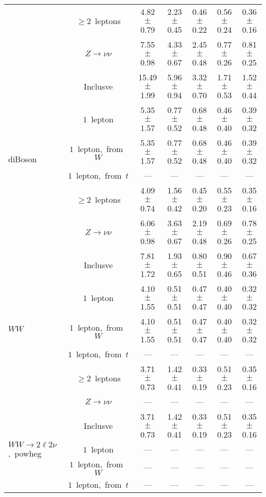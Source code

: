 \documentclass{article}
\begin{document}
\begin{longtable}{|l|c|c|c|c|c|c|}
 & $\ge2$~leptons  & 4.82 $\pm$ 0.79  & 2.23 $\pm$ 0.45  & 0.46 $\pm$ 0.22  & 0.56 $\pm$ 0.24  & 0.36 $\pm$ 0.16 \\* 
 & $Z\rightarrow\nu\nu$  & 7.55 $\pm$ 0.98  & 4.33 $\pm$ 0.67  & 2.45 $\pm$ 0.48  & 0.77 $\pm$ 0.26  & 0.81 $\pm$ 0.25 \\* 
\hline 
\multirow{6}{*}{diBoson} & Inclusve  & 15.49 $\pm$ 1.99  & 5.96 $\pm$ 0.94  & 3.32 $\pm$ 0.70  & 1.71 $\pm$ 0.53  & 1.52 $\pm$ 0.44 \\* 
 & $1$~lepton  & 5.35 $\pm$ 1.57  & 0.77 $\pm$ 0.52  & 0.68 $\pm$ 0.48  & 0.46 $\pm$ 0.40  & 0.39 $\pm$ 0.32 \\* 
 & $1$~lepton,~from~$W$  & 5.35 $\pm$ 1.57  & 0.77 $\pm$ 0.52  & 0.68 $\pm$ 0.48  & 0.46 $\pm$ 0.40  & 0.39 $\pm$ 0.32 \\* 
 & $1$~lepton,~from~$t$  & ---  & ---  & ---  & ---  & --- \\* 
 & $\ge2$~leptons  & 4.09 $\pm$ 0.74  & 1.56 $\pm$ 0.42  & 0.45 $\pm$ 0.20  & 0.55 $\pm$ 0.23  & 0.35 $\pm$ 0.16 \\* 
 & $Z\rightarrow\nu\nu$  & 6.06 $\pm$ 0.98  & 3.63 $\pm$ 0.67  & 2.19 $\pm$ 0.48  & 0.69 $\pm$ 0.26  & 0.78 $\pm$ 0.25 \\* 
\hline 
\multirow{6}{*}{$WW$} & Inclusve  & 7.81 $\pm$ 1.72  & 1.93 $\pm$ 0.65  & 0.80 $\pm$ 0.51  & 0.90 $\pm$ 0.46  & 0.67 $\pm$ 0.36 \\* 
 & $1$~lepton  & 4.10 $\pm$ 1.55  & 0.51 $\pm$ 0.51  & 0.47 $\pm$ 0.47  & 0.40 $\pm$ 0.40  & 0.32 $\pm$ 0.32 \\* 
 & $1$~lepton,~from~$W$  & 4.10 $\pm$ 1.55  & 0.51 $\pm$ 0.51  & 0.47 $\pm$ 0.47  & 0.40 $\pm$ 0.40  & 0.32 $\pm$ 0.32 \\* 
 & $1$~lepton,~from~$t$  & ---  & ---  & ---  & ---  & --- \\* 
 & $\ge2$~leptons  & 3.71 $\pm$ 0.73  & 1.42 $\pm$ 0.41  & 0.33 $\pm$ 0.19  & 0.51 $\pm$ 0.23  & 0.35 $\pm$ 0.16 \\* 
 & $Z\rightarrow\nu\nu$  & ---  & ---  & ---  & ---  & --- \\* 
\hline 
\multirow{6}{*}{$WW{\rightarrow}2\ell2\nu$,~powheg} & Inclusve  & 3.71 $\pm$ 0.73  & 1.42 $\pm$ 0.41  & 0.33 $\pm$ 0.19  & 0.51 $\pm$ 0.23  & 0.35 $\pm$ 0.16 \\* 
 & $1$~lepton  & ---  & ---  & ---  & ---  & --- \\* 
 & $1$~lepton,~from~$W$  & ---  & ---  & ---  & ---  & --- \\* 
 & $1$~lepton,~from~$t$  & ---  & ---  & ---  & ---  & --- \\* 

\end{longtable}
\end{document}
